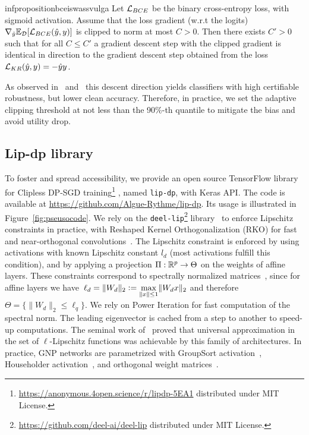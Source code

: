     \begin{restatable}{infproposition}{bceiswassvulga}\label{prop:bceiswassvulga}
    Let $\mathcal{L}_{BCE}$ be the binary cross-entropy loss, with sigmoid activation. Assume that the loss gradient (w.r.t the logits) $\nabla_{\hat y}\mathbb{E}_{\mathcal{D}}[\mathcal{L}_{BCE}(\hat y,y)]$ is clipped to norm at most $C>0$.
    Then there exists $C'>0$ such that for all $C\leq C'$ a gradient descent step with the clipped gradient is identical in direction to the  
    gradient descent step obtained from the loss $\mathcal{L}_{KR}(\hat y, y)=-\hat yy$. 
    \end{restatable}

    As observed in~\cite{serrurier2021achieving} and~\cite{bethune2022pay} this descent direction yields classifiers with high certifiable robustness, but lower clean accuracy. Therefore, in practice, we set the adaptive clipping threshold at not less than the 90\%-th quantile to mitigate the bias and avoid utility drop.    

\subsection{Lip-dp library}
\label{sec:lipdp}
To foster and spread accessibility, we provide an open source TensorFlow library for Clipless DP-SGD training\footnote{\url{https://anonymous.4open.science/r/lipdp-5EA1} distributed under MIT License.} , named \lstinline[basicstyle=\ttfamily, backgroundcolor=\color{gray!20}]{lip-dp}, with Keras API. The code is available at \url{https://github.com/Algue-Rythme/lip-dp}. Its usage is illustrated in Figure~\ref{fig:pseusocode}. We rely on the \lstinline[basicstyle=\ttfamily, backgroundcolor=\color{gray!20}]{deel-lip}\footnote{\url{https://github.com/deel-ai/deel-lip} distributed under MIT License.} library~\cite{serrurier2021achieving} to enforce Lipschitz constraints in practice, with Reshaped Kernel Orthogonalization (RKO) for fast and near-orthogonal convolutions~\citep{li2019orthogonal}.  The Lipschitz constraint is enforced by using activations with known Lipschitz constant $l_d$ (most activations fulfill this condition), and by applying a projection $\Pi:\mathbb{R}^p\rightarrow \Theta$ on the weights of affine layers. These constraints correspond to spectrally normalized  matrices~\cite{yoshida2017spectral,bartlett2017spectrally}, since for affine layers we have~${\ell_d=\|W_d\|_2\vcentcolon=\underset{\|x\|\leq 1}{\max}\|W_dx\|_2}$ and therefore $\Theta=\{\|W_d\|_2\leq \ell_q\}$. We rely on Power Iteration for fast computation of the spectral norm. The leading eigenvector is cached from a step to another to speed-up computations. The seminal work of~\cite{anil2019sorting} proved that universal approximation in the set of $\ell$-Lipschitz functions was achievable by this family of architectures. In practice, GNP networks are parametrized with GroupSort activation~\cite{anil2019sorting,tanielian2021approximating}, Householder activation~\cite{mhammedi2017efficient}, and orthogonal weight matrices~\cite{li2019preventing,li2019orthogonal}.


